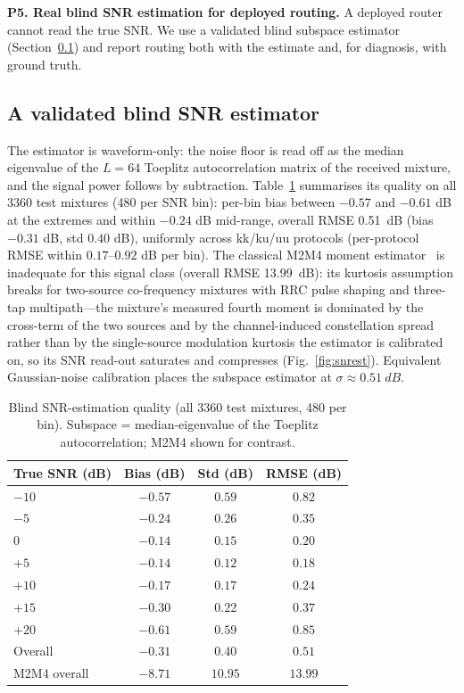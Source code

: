 \documentclass[review,12pt]{elsarticle}
\begin{document}
\textbf{P5. Real blind SNR estimation for deployed routing.} A deployed
router cannot read the true SNR\@. We use a validated blind subspace
estimator (Section~\ref{sec:snrest}) and report routing both with the
estimate and, for diagnosis, with ground truth.

\subsection{A validated blind SNR estimator}
\label{sec:snrest}

The estimator is waveform-only: the noise floor is read off as the
median eigenvalue of the $L{=}64$ Toeplitz autocorrelation matrix of
the received mixture, and the signal power follows by subtraction.
Table~\ref{tab:snrest} summarises its quality on all 3360 test
mixtures (480 per SNR bin): per-bin bias between $-0.57$ and
$-0.61$ dB at the extremes and within $-0.24$ dB mid-range, overall
RMSE \SI{0.51}{dB} (bias $-0.31$ dB, std $0.40$ dB), uniformly across
kk/ku/uu protocols (per-protocol RMSE within $0.17$--$0.92$ dB per
bin). The classical M2M4 moment estimator~\cite{pauluzzi2000snr} is
inadequate for this signal class (overall RMSE \SI{13.99}{dB}): its
kurtosis assumption breaks for two-source co-frequency mixtures with
RRC pulse shaping and three-tap multipath---the mixture's measured
fourth moment is dominated by the cross-term of the two sources and by
the channel-induced constellation spread rather than by the
single-source modulation kurtosis the estimator is calibrated on, so
its SNR read-out saturates and compresses
(Fig.~\ref{fig:snrest}). Equivalent Gaussian-noise calibration places
the subspace estimator at $\sigma \approx \SI{0.51}{dB}$.

\begin{table}[H]
\centering
\caption{Blind SNR-estimation quality (all 3360 test mixtures, 480 per
bin). Subspace = median-eigenvalue of the Toeplitz autocorrelation;
M2M4 shown for contrast.}
\label{tab:snrest}
{\small
\begin{tabular}{lccc}
\toprule
True SNR (dB) & Bias (dB) & Std (dB) & RMSE (dB) \\
\midrule
$-10$ & $-0.57$ & $0.59$ & $0.82$ \\
$-5$  & $-0.24$ & $0.26$ & $0.35$ \\
$0$   & $-0.14$ & $0.15$ & $0.20$ \\
$+5$  & $-0.14$ & $0.12$ & $0.18$ \\
$+10$ & $-0.17$ & $0.17$ & $0.24$ \\
$+15$ & $-0.30$ & $0.22$ & $0.37$ \\
$+20$ & $-0.61$ & $0.59$ & $0.85$ \\
\midrule
Overall & $-0.31$ & $0.40$ & $0.51$ \\
M2M4 overall & $-8.71$ & $10.95$ & $13.99$ \\
\bottomrule
\end{tabular}}
\end{table}
\end{document}
